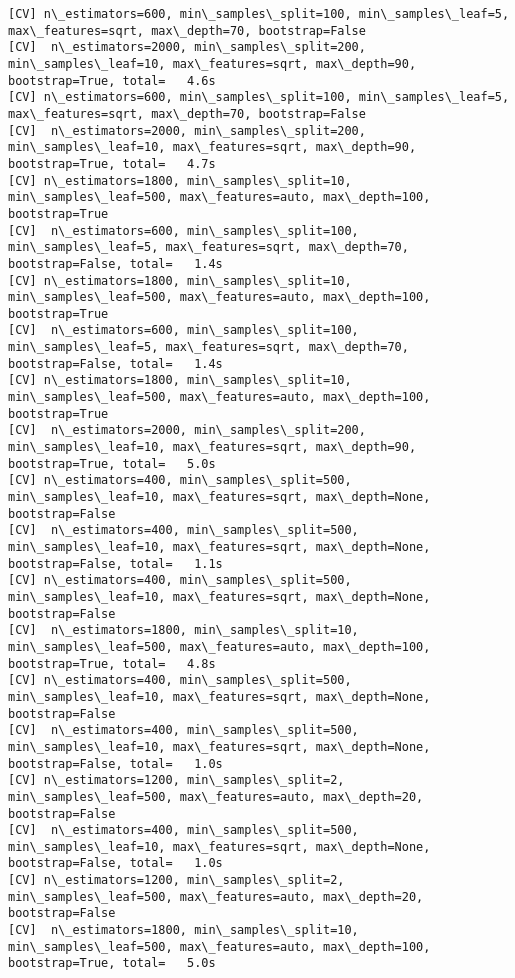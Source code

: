 \documentclass[11pt]{article}
\begin{document}
\begin{Verbatim}[commandchars=\\\{\}]
[CV] n\_estimators=600, min\_samples\_split=100, min\_samples\_leaf=5, max\_features=sqrt, max\_depth=70, bootstrap=False 
[CV]  n\_estimators=2000, min\_samples\_split=200, min\_samples\_leaf=10, max\_features=sqrt, max\_depth=90, bootstrap=True, total=   4.6s
[CV] n\_estimators=600, min\_samples\_split=100, min\_samples\_leaf=5, max\_features=sqrt, max\_depth=70, bootstrap=False 
[CV]  n\_estimators=2000, min\_samples\_split=200, min\_samples\_leaf=10, max\_features=sqrt, max\_depth=90, bootstrap=True, total=   4.7s
[CV] n\_estimators=1800, min\_samples\_split=10, min\_samples\_leaf=500, max\_features=auto, max\_depth=100, bootstrap=True 
[CV]  n\_estimators=600, min\_samples\_split=100, min\_samples\_leaf=5, max\_features=sqrt, max\_depth=70, bootstrap=False, total=   1.4s
[CV] n\_estimators=1800, min\_samples\_split=10, min\_samples\_leaf=500, max\_features=auto, max\_depth=100, bootstrap=True 
[CV]  n\_estimators=600, min\_samples\_split=100, min\_samples\_leaf=5, max\_features=sqrt, max\_depth=70, bootstrap=False, total=   1.4s
[CV] n\_estimators=1800, min\_samples\_split=10, min\_samples\_leaf=500, max\_features=auto, max\_depth=100, bootstrap=True 
[CV]  n\_estimators=2000, min\_samples\_split=200, min\_samples\_leaf=10, max\_features=sqrt, max\_depth=90, bootstrap=True, total=   5.0s
[CV] n\_estimators=400, min\_samples\_split=500, min\_samples\_leaf=10, max\_features=sqrt, max\_depth=None, bootstrap=False 
[CV]  n\_estimators=400, min\_samples\_split=500, min\_samples\_leaf=10, max\_features=sqrt, max\_depth=None, bootstrap=False, total=   1.1s
[CV] n\_estimators=400, min\_samples\_split=500, min\_samples\_leaf=10, max\_features=sqrt, max\_depth=None, bootstrap=False 
[CV]  n\_estimators=1800, min\_samples\_split=10, min\_samples\_leaf=500, max\_features=auto, max\_depth=100, bootstrap=True, total=   4.8s
[CV] n\_estimators=400, min\_samples\_split=500, min\_samples\_leaf=10, max\_features=sqrt, max\_depth=None, bootstrap=False 
[CV]  n\_estimators=400, min\_samples\_split=500, min\_samples\_leaf=10, max\_features=sqrt, max\_depth=None, bootstrap=False, total=   1.0s
[CV] n\_estimators=1200, min\_samples\_split=2, min\_samples\_leaf=500, max\_features=auto, max\_depth=20, bootstrap=False 
[CV]  n\_estimators=400, min\_samples\_split=500, min\_samples\_leaf=10, max\_features=sqrt, max\_depth=None, bootstrap=False, total=   1.0s
[CV] n\_estimators=1200, min\_samples\_split=2, min\_samples\_leaf=500, max\_features=auto, max\_depth=20, bootstrap=False 
[CV]  n\_estimators=1800, min\_samples\_split=10, min\_samples\_leaf=500, max\_features=auto, max\_depth=100, bootstrap=True, total=   5.0s

\end{Verbatim}
\end{document}
